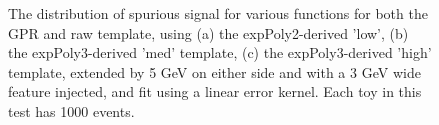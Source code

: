 \begin{figure} 
\begin{center}

\caption{The distribution of spurious signal for various functions for both the GPR and raw template, using (a) the expPoly2-derived 'low', (b) the expPoly3-derived 'med' template, (c) the expPoly3-derived 'high' template, extended by 5 GeV on either side and with a 3 GeV wide feature injected, and fit using a linear error kernel. Each toy in this test has 1000 events.}
\label{fig:linearkernel_lowpt_1000_Sig}
\end{center}
\end{figure}

